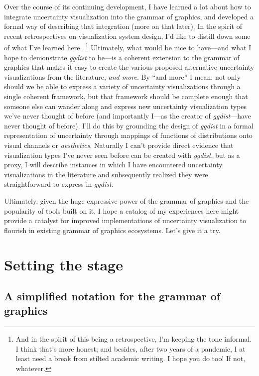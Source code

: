 \documentclass[journal]{vgtc}                     %
\begin{document}
Over the course of its continuing development, I have learned a lot about how to integrate uncertainty visualization into the grammar of graphics, and developed a formal way of describing that integration (more on that later). In the spirit of recent retrospectives on visualization system design, I'd like to distill down some of what I've learned here.~\footnote{And in the spirit of this being a retrospective, I'm keeping the tone informal. I think that's more honest; and besides, after two years of a pandemic, I at least need a break from stilted academic writing. I hope you do too! If not, whatever.} Ultimately, what would be nice to have---and what I hope to demonstrate \textit{ggdist} to be---is a coherent extension to the grammar of graphics that makes it easy to create the various proposed alternative uncertainty visualizations from the literature, \textit{and more}. By  ``and more'' I mean: not only should we be able to express a variety of uncertainty visualizations through a single coherent framework, but that framework should be complete enough that someone else can wander along and express new uncertainty visualization types we've never thought of before (and importantly I---as the creator of \textit{ggdist}---have never thought of before). I'll do this by grounding the design of \textit{ggdist} in a formal representation of uncertainty through mappings of functions of distributions onto visual channels or \textit{aesthetics}. Naturally I can't provide direct evidence that visualization types I've never seen before can be created with \textit{ggdist}, but as a proxy, I will describe instances in which I have encountered uncertainty visualizations in the literature and subsequently realized they were straightforward to express in \textit{ggdist}.

Ultimately, given the huge expressive power of the grammar of graphics and the popularity of tools built on it, I hope a catalog of my experiences here might provide a catalyst for improved implementations of uncertainty visualization to flourish in existing grammar of graphics ecosystems. Let's give it a try.

\section{Setting the stage}

\subsection{A simplified notation for the grammar of graphics}
\end{document}

